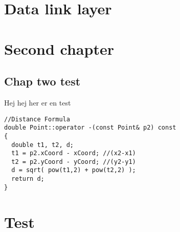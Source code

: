 \documentclass{report}
\begin{document}



\newpage\thispagestyle{plain}


\newpage\thispagestyle{plain}


\clearpage
\tableofcontents\thispagestyle{plain}
\listoffigures
\listoftables
\lstlistoflistings{}


\clearpage
{}



\newpage

\chapter{Data link layer}



\chapter{Second chapter}
\section{Chap two test}
Hej hej her er en test
\begin{lstlisting}[caption={Descriptive Caption Text},label=DescriptiveLabel]
//Distance Formula
double Point::operator -(const Point& p2) const
{
  double t1, t2, d;
  t1 = p2.xCoord - xCoord; //(x2-x1)
  t2 = p2.yCoord - yCoord; //(y2-y1)
  d = sqrt( pow(t1,2) + pow(t2,2) );
  return d;
}
\end{lstlisting}
 

\clearpage
\nocite{*} %
\printbibliography\thispagestyle{plain}
\pagestyle{plain}


\appendix %
\chapter{Test}
\end{document}
